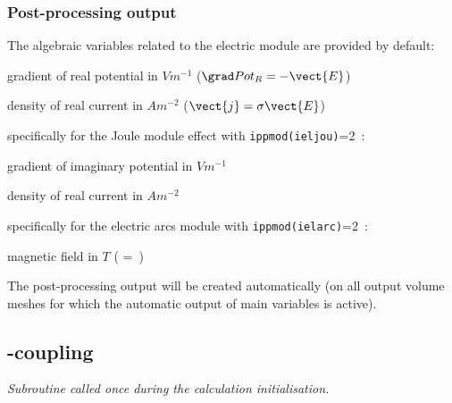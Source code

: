 {{{%
\subsubsection[{\em EnSight} output]
{Post-processing output}

The algebraic variables related to the electric module are provided by default:
\begin{list}{-}{}
\item gradient of real potential in $V m^{-1}$ ($\grad Pot_R = -\vect{E}$)
\item density of real current in $A m^{-2}$  ($\vect{j}=\sigma \vect{E}$)
\end{list}
specifically for the Joule module effect with \texttt{ippmod(ieljou)}=2~:
\begin{list}{-}{}
\item gradient of imaginary potential in $V m^{-1}$
\item density of real current in $A m^{-2}$
\end{list}
specifically for the electric arcs module with \texttt{ippmod(ielarc)}=2~:
\begin{list}{-}{}
\item magnetic field in $T$ ( = \,)
\end{list}

The post-processing output will be created automatically (on all output volume
meshes for which the automatic output of main variables is active).

\subsection{\CS-\CS coupling}

\noindent
\textit{Subroutine called once during the calculation initialisation.}

}}}
